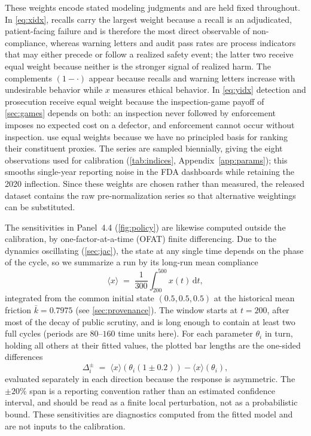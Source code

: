 \documentclass[10pt]{article}
\newcommand{\kbar}{\bar{k}}
\begin{document}
These weights encode stated modeling judgments and are held fixed throughout. In \cref{eq:xidx}, recalls carry the largest weight because a recall is an adjudicated, patient-facing failure and is therefore the most direct observable of non-compliance, whereas warning letters and audit pass rates are process indicators that may either precede or follow a realized safety event; the latter two receive equal weight because neither is the stronger signal of realized harm. The complements $(1-\cdot)$ appear because recalls and warning letters increase with undesirable behavior while $x$ measures ethical behavior. In \cref{eq:yidx} detection and prosecution receive equal weight because the inspection-game payoff of \cref{sec:games} depends on both: an inspection never followed by enforcement imposes no expected cost on a defector, and enforcement cannot occur without inspection.  use equal weights because we have no principled basis for ranking their constituent proxies. The series are sampled biennially, giving the eight observations used for calibration (\cref{tab:indices}, Appendix~\ref{app:params}); this smooths single-year reporting noise in the FDA dashboards while retaining the 2020 inflection. Since these weights are chosen rather than measured, the released dataset contains the raw pre-normalization series so that alternative weightings can be substituted.

The sensitivities in Panel~4.4 (\cref{fig:policy}) are likewise computed outside the calibration, by one-factor-at-a-time (OFAT) finite differencing. Due to the dynamics oscillating (\cref{sec:jac}), the state at any single time depends on the phase of the cycle, so we summarize a run by its long-run mean compliance
\begin{equation}
\langle x\rangle \;=\; \frac{1}{300}\int_{200}^{500} x(t)\,\mathrm{d} t ,
\label{eq:meanx}
\end{equation}
integrated from the common initial state $(0.5,0.5,0.5)$ at the historical mean friction $\kbar=0.7975$ (see \cref{sec:provenance}). The window starts at $t=200$, after most of the decay of public scrutiny, and is long enough to contain at least two full cycles (periods are $80$--$160$ time units here). For each parameter $\theta_i$ in turn, holding all others at their fitted values, the plotted bar lengths are the one-sided differences
\begin{equation}
\Delta^{\pm}_i \;=\; \langle x\rangle\!\left(\theta_i (1 \pm 0.2)\right) - \langle x\rangle\!\left(\theta_i\right),
\label{eq:tornado}
\end{equation}
evaluated separately in each direction because the response is asymmetric. The $\pm20\%$ span is a reporting convention rather than an estimated confidence interval, and should be read as a finite local perturbation, not as a probabilistic bound. These sensitivities are diagnostics computed from the fitted model and are not inputs to the calibration.
\end{document}
